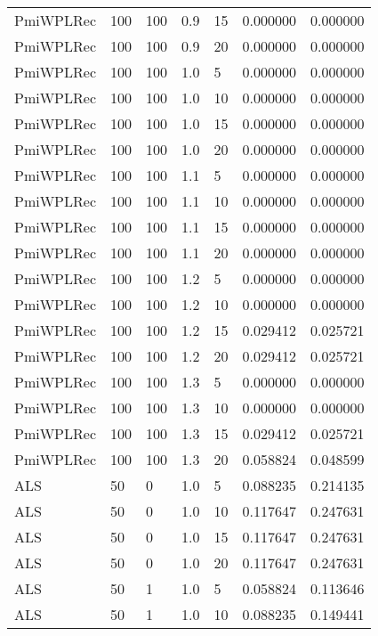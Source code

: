 \begin{tabular}{lllrlrr}
 PmiWPLRec &  100 &   100 &   0.9 &   15 &     0.000000 &  0.000000 \\
 PmiWPLRec &  100 &   100 &   0.9 &   20 &     0.000000 &  0.000000 \\
 PmiWPLRec &  100 &   100 &   1.0 &    5 &     0.000000 &  0.000000 \\
 PmiWPLRec &  100 &   100 &   1.0 &   10 &     0.000000 &  0.000000 \\
 PmiWPLRec &  100 &   100 &   1.0 &   15 &     0.000000 &  0.000000 \\
 PmiWPLRec &  100 &   100 &   1.0 &   20 &     0.000000 &  0.000000 \\
 PmiWPLRec &  100 &   100 &   1.1 &    5 &     0.000000 &  0.000000 \\
 PmiWPLRec &  100 &   100 &   1.1 &   10 &     0.000000 &  0.000000 \\
 PmiWPLRec &  100 &   100 &   1.1 &   15 &     0.000000 &  0.000000 \\
 PmiWPLRec &  100 &   100 &   1.1 &   20 &     0.000000 &  0.000000 \\
 PmiWPLRec &  100 &   100 &   1.2 &    5 &     0.000000 &  0.000000 \\
 PmiWPLRec &  100 &   100 &   1.2 &   10 &     0.000000 &  0.000000 \\
 PmiWPLRec &  100 &   100 &   1.2 &   15 &     0.029412 &  0.025721 \\
 PmiWPLRec &  100 &   100 &   1.2 &   20 &     0.029412 &  0.025721 \\
 PmiWPLRec &  100 &   100 &   1.3 &    5 &     0.000000 &  0.000000 \\
 PmiWPLRec &  100 &   100 &   1.3 &   10 &     0.000000 &  0.000000 \\
 PmiWPLRec &  100 &   100 &   1.3 &   15 &     0.029412 &  0.025721 \\
 PmiWPLRec &  100 &   100 &   1.3 &   20 &     0.058824 &  0.048599 \\
       ALS &   50 &     0 &   1.0 &    5 &     0.088235 &  0.214135 \\
       ALS &   50 &     0 &   1.0 &   10 &     0.117647 &  0.247631 \\
       ALS &   50 &     0 &   1.0 &   15 &     0.117647 &  0.247631 \\
       ALS &   50 &     0 &   1.0 &   20 &     0.117647 &  0.247631 \\
       ALS &   50 &     1 &   1.0 &    5 &     0.058824 &  0.113646 \\
       ALS &   50 &     1 &   1.0 &   10 &     0.088235 &  0.149441 \\

\end{tabular}
